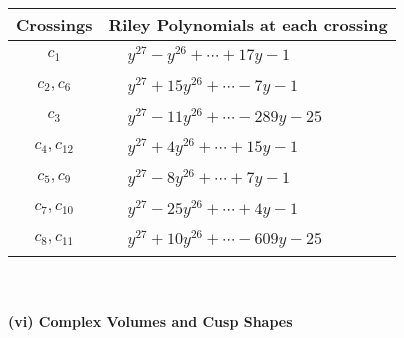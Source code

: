\documentclass[1p]{elsarticle_modified}
\theoremstyle{definition}
\begin{document}
\begin{tabular}{m{50pt}|m{274pt}}
Crossings & \hspace{64pt}Riley Polynomials at each crossing \\
\hline $$\begin{aligned}c_{1}\end{aligned}$$&$\begin{aligned}
&y^{27}- y^{26}+\cdots+17 y-1
\end{aligned}$\\
\hline $$\begin{aligned}c_{2},c_{6}\end{aligned}$$&$\begin{aligned}
&y^{27}+15 y^{26}+\cdots-7 y-1
\end{aligned}$\\
\hline $$\begin{aligned}c_{3}\end{aligned}$$&$\begin{aligned}
&y^{27}-11 y^{26}+\cdots-289 y-25
\end{aligned}$\\
\hline $$\begin{aligned}c_{4},c_{12}\end{aligned}$$&$\begin{aligned}
&y^{27}+4 y^{26}+\cdots+15 y-1
\end{aligned}$\\
\hline $$\begin{aligned}c_{5},c_{9}\end{aligned}$$&$\begin{aligned}
&y^{27}-8 y^{26}+\cdots+7 y-1
\end{aligned}$\\
\hline $$\begin{aligned}c_{7},c_{10}\end{aligned}$$&$\begin{aligned}
&y^{27}-25 y^{26}+\cdots+4 y-1
\end{aligned}$\\
\hline $$\begin{aligned}c_{8},c_{11}\end{aligned}$$&$\begin{aligned}
&y^{27}+10 y^{26}+\cdots-609 y-25
\end{aligned}$\\
\hline
\end{tabular}\\~\\
\newpage\flushleft \textbf{(vi) Complex Volumes and Cusp Shapes}
\end{document}
